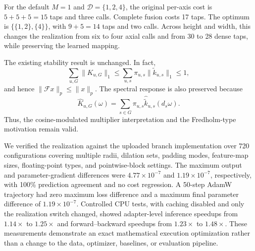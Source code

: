 For the default $M=1$ and $\mathcal{D}=\{1,2,4\}$, the original per-axis cost is
$5+5+5=15$ taps and three calls. Complete fusion costs 17 taps. The optimum is
$\{\{1,2\},\{4\}\}$, with $9+5=14$ taps and two calls. Across height and width,
this changes the realization from six to four axial calls and from 30 to 28 dense
taps, while preserving the learned mapping.

The existing stability result is unchanged. In fact,
\begin{equation}
\sum_{u,G}\lVert K_{u,G}\rVert_1
\le
\sum_{u,s}\pi_{u,s}\lVert\widetilde{k}_{u,s}\rVert_1
\le 1,
\end{equation}
and hence $\lVert\mathcal{F}x\rVert_p\le\lVert x\rVert_p$. The spectral response
is also preserved because
\begin{equation}
\widehat{K}_{u,G}(\omega)
=
\sum_{s\in G}\pi_{u,s}
\widehat{\widetilde{k}}_{u,s}(d_s\omega).
\end{equation}
Thus, the cosine-modulated multiplier interpretation and the Fredholm-type
motivation remain valid.

We verified the realization against the uploaded branch implementation over 720
configurations covering multiple radii, dilation sets, padding modes, feature-map
sizes, floating-point types, and pointwise-block settings. The maximum output
and parameter-gradient differences were $4.77\times10^{-7}$ and
$1.19\times10^{-7}$, respectively, with 100\% prediction agreement and no cost
regression. A 50-step AdamW trajectory had zero maximum loss difference and a
maximum final parameter difference of $1.19\times10^{-7}$. Controlled CPU tests,
with caching disabled and only the realization switch changed, showed adapter-level
inference speedups from $1.14\times$ to $1.25\times$ and forward--backward speedups
from $1.23\times$ to $1.48\times$. These measurements demonstrate an exact
mathematical execution optimization rather than a change to the data, optimizer,
baselines, or evaluation pipeline.
